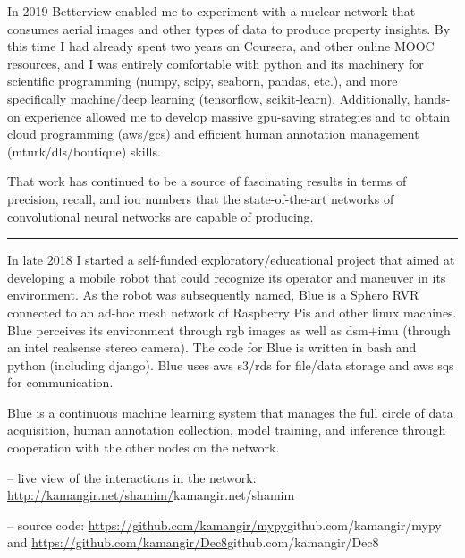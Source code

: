 \osspacing
In 2019 Betterview enabled me to experiment with a nuclear network that consumes aerial images and other types of data to produce property insights. By this time I had already spent two years on Coursera, and other online MOOC resources, and I was entirely comfortable with python and its machinery for scientific programming (numpy, scipy, seaborn, pandas, etc.), and more specifically machine/deep learning (tensorflow, scikit-learn). Additionally, hands-on experience allowed me to develop massive gpu-saving strategies and to obtain cloud programming (aws/gcs) and efficient human annotation management (mturk/dls/boutique) skills. 

\osspacing
That work has continued to be a source of fascinating results in terms of precision, recall, and iou numbers that the state-of-the-art networks of convolutional neural networks are capable of producing.

\noindent\rule{8cm}{0.4pt}

\osspacing
In late 2018 I started a self-funded exploratory/educational project that aimed at developing a mobile robot that could recognize its operator and maneuver in its environment. As the robot was subsequently named, Blue is a Sphero RVR connected to an ad-hoc mesh network of Raspberry Pis and other linux machines. Blue perceives its environment through rgb images as well as dsm+imu (through an intel realsense stereo camera). The code for Blue is written in bash and python (including django). Blue uses aws s3/rds for file/data storage and aws sqs for communication. 

\osspacing
Blue is a continuous machine learning system that manages the full circle of data acquisition, human annotation collection, model training, and inference through cooperation with the other nodes on the network. 

-- live view of the interactions in the network: \url{http://kamangir.net/shamim/}{kamangir.net/shamim} 

-- source code: \url{https://github.com/kamangir/mypy}{github.com/kamangir/mypy} and \url{https://github.com/kamangir/Dec8}{github.com/kamangir/Dec8}

\newpage